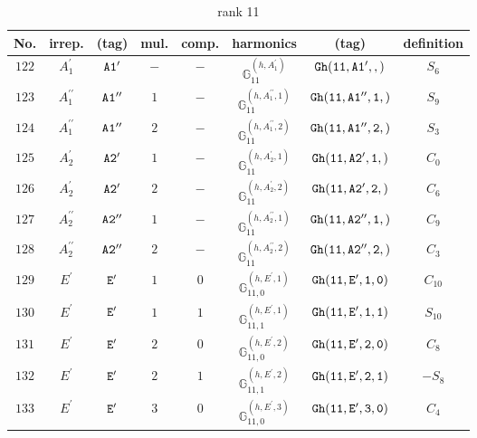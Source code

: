 \documentclass[fleqn,8pt]{jsarticle}
\begin{document}
\begin{table}[ht!]
\begin{center}
\caption{rank 11}
\renewcommand{\arraystretch}{1.3}
\begin{tabular}{cccccccc} \hline \hline
No. & irrep. & (tag) & mul. & comp. & harmonics & (tag) & definition \\ \hline
$ 122 $ & $ A_{1}^{\prime} $ & $ {\tt A1'} $ & $ - $ & $ - $ & $ \mathbb{G}_{11}^{(h,A_{1}^{\prime})} $ & $ {\tt Gh(11,A1',,)} $ & $ S_{6} $ \\
$ 123 $ & $ A_{1}^{\prime\prime} $ & $ {\tt A1''} $ & $ 1 $ & $ - $ & $ \mathbb{G}_{11}^{(h,A_{1}^{\prime\prime},1)} $ & $ {\tt Gh(11,A1'',1,)} $ & $ S_{9} $ \\
$ 124 $ & $ A_{1}^{\prime\prime} $ & $ {\tt A1''} $ & $ 2 $ & $ - $ & $ \mathbb{G}_{11}^{(h,A_{1}^{\prime\prime},2)} $ & $ {\tt Gh(11,A1'',2,)} $ & $ S_{3} $ \\
$ 125 $ & $ A_{2}^{\prime} $ & $ {\tt A2'} $ & $ 1 $ & $ - $ & $ \mathbb{G}_{11}^{(h,A_{2}^{\prime},1)} $ & $ {\tt Gh(11,A2',1,)} $ & $ C_{0} $ \\
$ 126 $ & $ A_{2}^{\prime} $ & $ {\tt A2'} $ & $ 2 $ & $ - $ & $ \mathbb{G}_{11}^{(h,A_{2}^{\prime},2)} $ & $ {\tt Gh(11,A2',2,)} $ & $ C_{6} $ \\
$ 127 $ & $ A_{2}^{\prime\prime} $ & $ {\tt A2''} $ & $ 1 $ & $ - $ & $ \mathbb{G}_{11}^{(h,A_{2}^{\prime\prime},1)} $ & $ {\tt Gh(11,A2'',1,)} $ & $ C_{9} $ \\
$ 128 $ & $ A_{2}^{\prime\prime} $ & $ {\tt A2''} $ & $ 2 $ & $ - $ & $ \mathbb{G}_{11}^{(h,A_{2}^{\prime\prime},2)} $ & $ {\tt Gh(11,A2'',2,)} $ & $ C_{3} $ \\
$ 129 $ & $ E^{\prime} $ & $ {\tt E'} $ & $ 1 $ & $ 0 $ & $ \mathbb{G}_{11,0}^{(h,E^{\prime},1)} $ & $ {\tt Gh(11,E',1,0)} $ & $ C_{10} $ \\
$ 130 $ & $ E^{\prime} $ & $ {\tt E'} $ & $ 1 $ & $ 1 $ & $ \mathbb{G}_{11,1}^{(h,E^{\prime},1)} $ & $ {\tt Gh(11,E',1,1)} $ & $ S_{10} $ \\
$ 131 $ & $ E^{\prime} $ & $ {\tt E'} $ & $ 2 $ & $ 0 $ & $ \mathbb{G}_{11,0}^{(h,E^{\prime},2)} $ & $ {\tt Gh(11,E',2,0)} $ & $ C_{8} $ \\
$ 132 $ & $ E^{\prime} $ & $ {\tt E'} $ & $ 2 $ & $ 1 $ & $ \mathbb{G}_{11,1}^{(h,E^{\prime},2)} $ & $ {\tt Gh(11,E',2,1)} $ & $ - S_{8} $ \\
$ 133 $ & $ E^{\prime} $ & $ {\tt E'} $ & $ 3 $ & $ 0 $ & $ \mathbb{G}_{11,0}^{(h,E^{\prime},3)} $ & $ {\tt Gh(11,E',3,0)} $ & $ C_{4} $ \\

\end{tabular}
\end{center}
\end{table}
\end{document}
